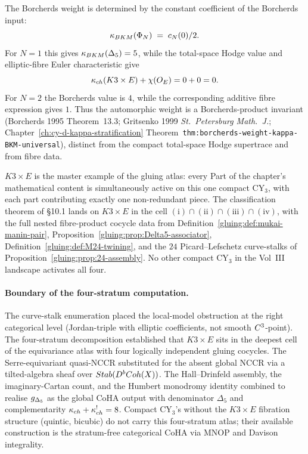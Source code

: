\begin{remark}
\label{gluing:rem:borcherds-not-additive-fibre}
The Borcherds weight is determined by the constant coefficient of the
Borcherds input:
\[
 \kappa_{BKM}(\Phi_N) \;=\; c_N(0)/2.
\]
For $N = 1$ this gives $\kappa_{BKM}(\Delta_5)=5$, while the total-space
Hodge value and elliptic-fibre Euler characteristic give
\[
 \kappa_{ch}(K3 \times E)+\chi(O_E)=0+0=0.
\]
For $N = 2$ the Borcherds value is $4$, while the corresponding
additive fibre expression gives $1$. Thus the automorphic weight is a
Borcherds-product invariant (Borcherds 1995 Theorem~13.3; Gritsenko
1999 \emph{St.\ Petersburg Math.\ J.}; Chapter~\ref{ch:cy-d-kappa-stratification}
Theorem~\texttt{thm:borcherds-weight-kappa-BKM-universal}), distinct
from the compact total-space Hodge supertrace and from fibre data.
\end{remark}

\begin{remark}
\label{gluing:rem:master-example}
$K3 \times E$ is the master example of the gluing atlas: every
Part of the chapter's mathematical content is simultaneously
active on this one compact CY$_3$, with each part contributing
exactly one non-redundant piece. The classification theorem of
\S 10.1 lands on $K3 \times E$ in the cell
$(\text{i}) \cap (\text{ii}) \cap (\text{iii}) \cap (\text{iv})$,
with the full nested fibre-product cocycle data from
Definition~\ref{gluing:def:mukai-manin-pair},
Proposition~\ref{gluing:prop:Delta5-associator},
Definition~\ref{gluing:def:M24-twining}, and the $24$ Picard--Lefschetz
curve-stalks of Proposition~\ref{gluing:prop:24-assembly}. No other
compact CY$_3$ in the Vol~III landscape activates all four.
\end{remark}

\paragraph{Boundary of the four-stratum computation.}
The curve-stalk enumeration placed the local-model obstruction at
the right categorical level (Jordan-triple with elliptic
coefficients, not smooth $C^3$-point). The four-stratum
decomposition established that $K3 \times E$ sits in the deepest
cell of the equivariance atlas with four logically independent
gluing cocycles. The Serre-equivariant quasi-NCCR substituted for
the absent global NCCR via a tilted-algebra sheaf over
$Stab(D^bCoh(X))$. The Hall--Drinfeld assembly, the
imaginary-Cartan count, and the Humbert monodromy identity
combined to realise $g_{\Delta_5}$ as the global CoHA output
with denominator $\Delta_5$ and complementarity $\kappa_{ch} + \kappa_{ch}^! =
8$. Compact CY$_3$'s without the $K3 \times E$ fibration structure
(quintic, bicubic) do not carry this four-stratum atlas; their
available construction is the stratum-free categorical CoHA via MNOP
and Davison integrality.

